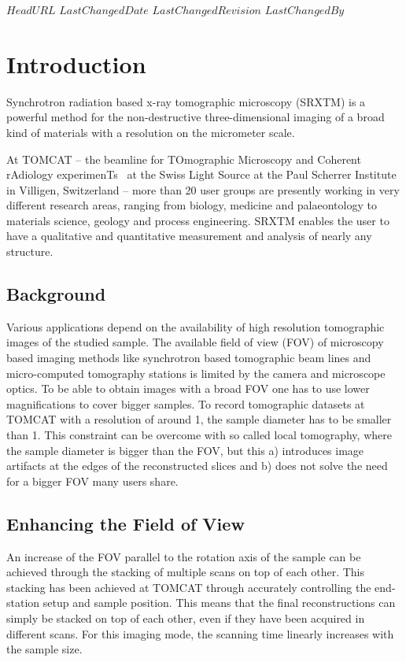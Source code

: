 \svnidlong
{$HeadURL$}
{$LastChangedDate$}
{$LastChangedRevision$}
{$LastChangedBy$}
\section{Introduction}
Synchrotron radiation based x-ray tomographic microscopy (SRXTM) is a powerful method for the non-destructive three-dimensional imaging of a broad kind of materials with a resolution on the micrometer scale.

At TOMCAT -- the beamline for TOmographic Microscopy and Coherent rAdiology experimenTs~\cite{Stampanoni2007} at the Swiss Light Source at the Paul Scherrer Institute in Villigen, Switzerland -- more than 20 user groups are presently working in very different research areas, ranging from biology, medicine and palaeontology to materials science, geology and process engineering. SRXTM enables the user to have a qualitative and quantitative measurement and analysis of nearly any structure.

\subsection{Background}
Various applications depend on the availability of high resolution tomographic images of the studied sample. The available field of view (FOV) of microscopy based imaging methods like synchrotron based tomographic beam lines and micro-computed tomography stations is limited by the camera and microscope optics. To be able to obtain images with a broad FOV one has to use lower magnifications to cover bigger samples. 
To record tomographic datasets at TOMCAT with a resolution of around \unit{1}{\micro\meter}, the sample diameter has to be smaller than \unit{1}{\milli\meter}. This constraint can be overcome with so called local tomography, where the sample diameter is bigger than the FOV, but this a) introduces image artifacts at the edges of the reconstructed slices and b) does not solve the need for a bigger FOV many users share.

\subsection{Enhancing the Field of View}
An increase of the FOV parallel to the rotation axis of the sample can be achieved through the stacking of multiple scans on top of each other. This stacking has been achieved at TOMCAT through accurately controlling the end-station setup and sample position.
This means that the final reconstructions can simply be stacked on top of each other, even if they have been acquired in different scans. For this imaging mode, the scanning time linearly increases with the sample size.

